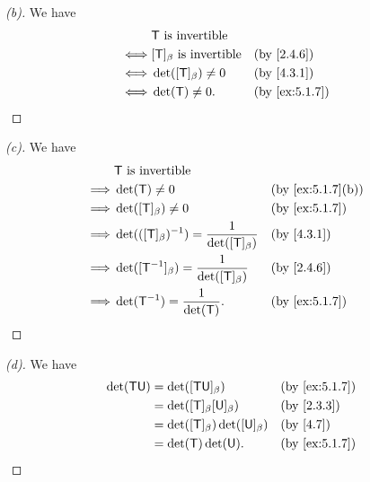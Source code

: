 \begin{proof}[(b)]
  We have
  \begin{align*}
         & \T \text{ is invertible}                                            \\
    \iff & [\T]_{\beta} \text{ is invertible} &  & \text{(by \cref{2.4.6})}    \\
    \iff & \det([\T]_{\beta}) \neq 0          &  & \text{(by \cref{4.3.1})}    \\
    \iff & \det(\T) \neq 0.                   &  & \text{(by \cref{ex:5.1.7})}
  \end{align*}
\end{proof}

\begin{proof}[(c)]
  We have
  \begin{align*}
             & \T \text{ is invertible}                                                                     \\
    \implies & \det(\T) \neq 0                                          &  & \text{(by \cref{ex:5.1.7}(b))} \\
    \implies & \det([\T]_{\beta}) \neq 0                                &  & \text{(by \cref{ex:5.1.7})}    \\
    \implies & \det(([\T]_{\beta})^{-1}) = \frac{1}{\det([\T]_{\beta})} &  & \text{(by \cref{4.3.1})}       \\
    \implies & \det([\T^{-1}]_{\beta}) = \frac{1}{\det([\T]_{\beta})}   &  & \text{(by \cref{2.4.6})}       \\
    \implies & \det(\T^{-1}) = \frac{1}{\det(\T)}.                      &  & \text{(by \cref{ex:5.1.7})}
  \end{align*}
\end{proof}

\begin{proof}[(d)]
  We have
  \begin{align*}
    \det(\T \U) & = \det([\T \U]_{\beta})                 &  & \text{(by \cref{ex:5.1.7})} \\
                & = \det([\T]_{\beta} [\U]_{\beta})       &  & \text{(by \cref{2.3.3})}    \\
                & = \det([\T]_{\beta}) \det([\U]_{\beta}) &  & \text{(by \cref{4.7})}      \\
                & = \det(\T) \det(\U).                    &  & \text{(by \cref{ex:5.1.7})}
  \end{align*}
\end{proof}

